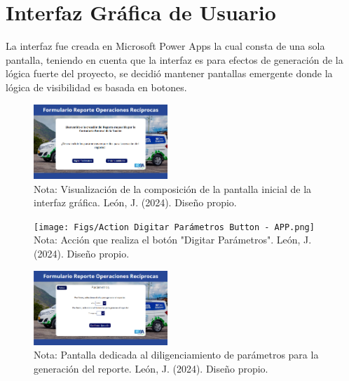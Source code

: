 \documentclass[letter,oneside,12pt,spanish]{report}
\begin{document}
\section{Interfaz Gráfica de Usuario}

\noindent La interfaz fue creada en Microsoft Power Apps la cual consta de una sola pantalla, teniendo en cuenta que la interfaz es para efectos de generación de la lógica fuerte del proyecto, se decidió mantener pantallas emergente donde la lógica de visibilidad es basada en botones.

\begin{figure}[ht]
    \centering
    \includegraphics[width=0.45\textwidth]{Figs/Pantalla Inicial - APP.png}
    \label{fig:MainScreen}
    \\Nota: Visualización de la composición de la pantalla inicial de la interfaz gráfica. León, J. (2024). Diseño propio.
\end{figure}


\begin{figure}[ht]
    \centering
    \texttt{[image: Figs/Action Digitar Parámetros Button - APP.png]}
    \label{fig:ActionButtonDigitar}
    \\Nota: Acción que realiza el botón "Digitar Parámetros". León, J. (2024). Diseño propio.
\end{figure}

\begin{figure}[ht]
    \centering
    \includegraphics[width=0.45\textwidth]{Figs/Parametros - APP.png}
    \label{fig:DiligenciarScreen}
    \\Nota: Pantalla dedicada al diligenciamiento de parámetros para la generación del reporte. León, J. (2024). Diseño propio.
\end{figure}
\end{document}
